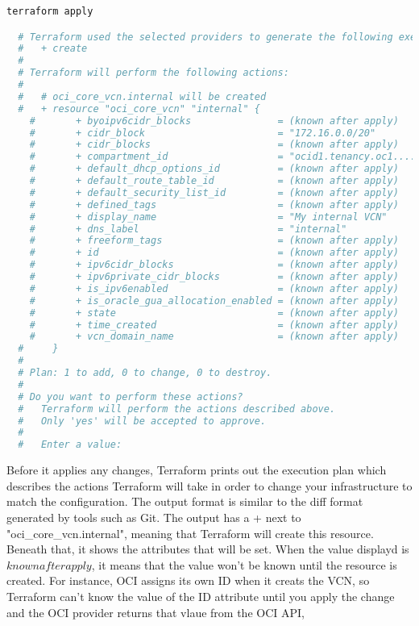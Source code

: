 \documentclass[../main.tex]{subfiles}
\begin{document}
\begin{lstlisting}[language=bash]
  terraform apply

  # Terraform used the selected providers to generate the following execution plan. Resource actions are indicated with the following symbols:
  #   + create
  # 
  # Terraform will perform the following actions:
  # 
  #   # oci_core_vcn.internal will be created
  #   + resource "oci_core_vcn" "internal" {
    #       + byoipv6cidr_blocks               = (known after apply)
    #       + cidr_block                       = "172.16.0.0/20"
    #       + cidr_blocks                      = (known after apply)
    #       + compartment_id                   = "ocid1.tenancy.oc1...."
    #       + default_dhcp_options_id          = (known after apply)
    #       + default_route_table_id           = (known after apply)
    #       + default_security_list_id         = (known after apply)
    #       + defined_tags                     = (known after apply)
    #       + display_name                     = "My internal VCN"
    #       + dns_label                        = "internal"
    #       + freeform_tags                    = (known after apply)
    #       + id                               = (known after apply)
    #       + ipv6cidr_blocks                  = (known after apply)
    #       + ipv6private_cidr_blocks          = (known after apply)
    #       + is_ipv6enabled                   = (known after apply)
    #       + is_oracle_gua_allocation_enabled = (known after apply)
    #       + state                            = (known after apply)
    #       + time_created                     = (known after apply)
    #       + vcn_domain_name                  = (known after apply)
  #     }
  # 
  # Plan: 1 to add, 0 to change, 0 to destroy.
  # 
  # Do you want to perform these actions?
  #   Terraform will perform the actions described above.
  #   Only 'yes' will be accepted to approve.
  # 
  #   Enter a value:
\end{lstlisting}

Before it applies any changes, Terraform prints out the execution plan which describes the actions Terraform will take in order to change your infrastructure to match the configuration.
The output format is similar to the diff format generated by tools such as Git.
The output has a + next to "oci\_core\_vcn.internal", meaning that Terraform will create this resource. Beneath that, it shows the attributes that will be set.
When the value displayd is \(known after apply\), it means that the value won't be known until the resource is created.
For instance, \gls{OCI} assigns its own ID when it creats the \gls{VCN}, so Terraform can't know the value of the ID attribute until you apply the change and the \gls{OCI} provider returns that vlaue from the \gls{OCI} \gls{API},
\end{document}

